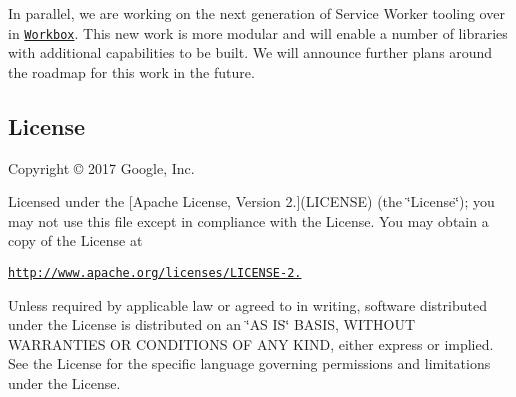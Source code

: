 In parallel, we are working on the next generation of Service Worker tooling over in \href{https://github.com/GoogleChrome/workbox}{\tt Workbox}. This new work is more modular and will enable a number of libraries with additional capabilities to be built. We will announce further plans around the roadmap for this work in the future.

\subsection*{License}

Copyright © 2017 Google, Inc.

Licensed under the \mbox{[}Apache License, Version 2.\mbox{]}(L\+I\+C\+E\+N\+SE) (the \char`\"{}\+License\char`\"{}); you may not use this file except in compliance with the License. You may obtain a copy of the License at

\href{http://www.apache.org/licenses/LICENSE-2.0}{\tt http\+://www.\+apache.\+org/licenses/\+L\+I\+C\+E\+N\+S\+E-\/2.}

Unless required by applicable law or agreed to in writing, software distributed under the License is distributed on an \char`\"{}\+A\+S I\+S\char`\"{} B\+A\+S\+IS, W\+I\+T\+H\+O\+UT W\+A\+R\+R\+A\+N\+T\+I\+ES OR C\+O\+N\+D\+I\+T\+I\+O\+NS OF A\+NY K\+I\+ND, either express or implied. See the License for the specific language governing permissions and limitations under the License. 